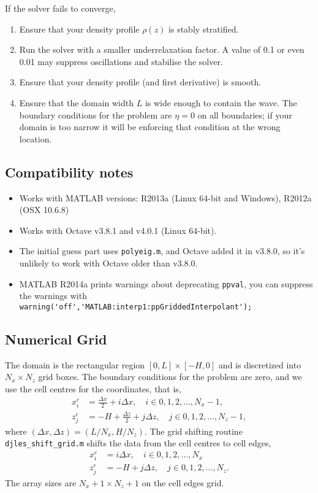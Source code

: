 \documentclass[letterpaper]{article}
\begin{document}
If the solver fails to converge, 
\begin{enumerate}
 \item Ensure that your density profile $\rho(z)$ is stably stratified.
 \item Run the solver with a smaller underrelaxation factor. A value of 0.1 or even 0.01 may suppress oscillations and stabilise the solver. 
 \item Ensure that your density profile (and first derivative) is smooth.
 \item Ensure that the domain width $L$ is wide enough to contain the wave. The boundary conditions for the problem are $\eta=0$ on all boundaries; if your domain is too narrow it will be enforcing that condition at the wrong location.
\end{enumerate}

\subsection{Compatibility notes}
\begin{itemize}
 \item Works with MATLAB versions: R2013a (Linux 64-bit and Windows), R2012a (OSX 10.6.8)
 \item Works with Octave v3.8.1 and v4.0.1 (Linux 64-bit).
 \item The initial guess part uses \verb+polyeig.m+, and Octave added it in v3.8.0, so it's unlikely to work with Octave older than v3.8.0.
 \item MATLAB R2014a prints warnings about deprecating \verb+ppval+, you can suppress the warnings with \\ \verb+warning('off','MATLAB:interp1:ppGriddedInterpolant');+
\end{itemize}

\subsection{Numerical Grid}
The domain is the rectangular region $[0,L] \times [-H,0]$ and is discretized into $N_x\times N_z$ grid boxes. The boundary conditions for the problem are zero, and we use the cell centres for the coordinates, that is,
\begin{align}
x_i^c &= \frac{\Delta x}{2} + i \Delta x, \quad i \in 0,1,2,\ldots,N_x-1,\\
z_j^c &= -H + \frac{\Delta z}{2} + j \Delta z, \quad j \in 0,1,2,\ldots,N_z-1,
\end{align}
where $(\Delta x, \Delta z) = (L/N_x, H/N_z)$. The grid shifting routine \verb+djles_shift_grid.m+ shifts the data from the cell centres to cell edges, 
\begin{align}
x_i^e &= i \Delta x, \quad i \in 0,1,2,\ldots,N_x\\
z_j^e &= -H + j \Delta z, \quad j  \in 0,1,2,\ldots,N_z.
\end{align}
The array sizes are $N_x+1 \times N_z+1$ on the cell edges grid.
\end{document}
